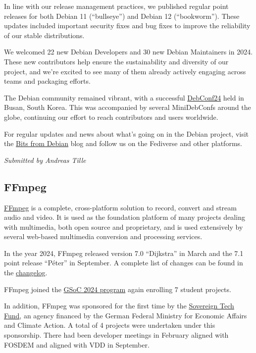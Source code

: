 \documentclass[a4paper]{report}
\begin{document}
In line with our release management practices, we published regular point releases for both Debian 11 (``bullseye'') and Debian 12 (``bookworm''). These updates included important security fixes and bug fixes to improve the reliability of our stable distributions.

We welcomed 22 new Debian Developers and 30 new Debian Maintainers in 2024. These new contributors help ensure the sustainability and diversity of our project, and we’re excited to see many of them already actively engaging across teams and packaging efforts.

The Debian community remained vibrant, with a successful \href{https://debconf24.debconf.org/}{DebConf24} held in Busan, South Korea. This was accompanied by several MiniDebConfs around the globe, continuing our effort to reach contributors and users worldwide.

For regular updates and news about what’s going on in the Debian project, visit the \href{https://bits.debian.org/}{Bits from Debian} blog and follow us on the Fediverse and other platforms.

{\em Submitted by Andreas Tille}

\subsection{FFmpeg}

\href{https://www.ffmpeg.org}{FFmpeg} is a complete, cross-platform solution to record, convert and stream audio and video. It is used as the foundation platform of many projects dealing with multimedia, both open source and proprietary, and is used extensively by several web-based multimedia conversion and processing services.

In the year 2024, FFmpeg released version 7.0 ``Dijkstra'' in March and the 7.1 point release ``Péter'' in September. A complete list of changes can be found in the \href{https://git.ffmpeg.org/gitweb/ffmpeg.git/blob/HEAD:/Changelog}{changelog}.

FFmpeg joined the \href{https://summerofcode.withgoogle.com/programs/2024/organizations/ffmpeg}{GSoC 2024 program} again enrolling 7 student projects.

In addition, FFmpeg was sponsored for the first time by the \href{https://www.sovereign.tech/tech/ffmpeg}{Sovereign Tech Fund}, an agency financed by the German Federal Ministry for Economic Affairs and Climate Action. A total of 4 projects were undertaken under this sponsorship. There had been developer meetings in February aligned with FOSDEM and aligned with VDD in September.
\end{document}
